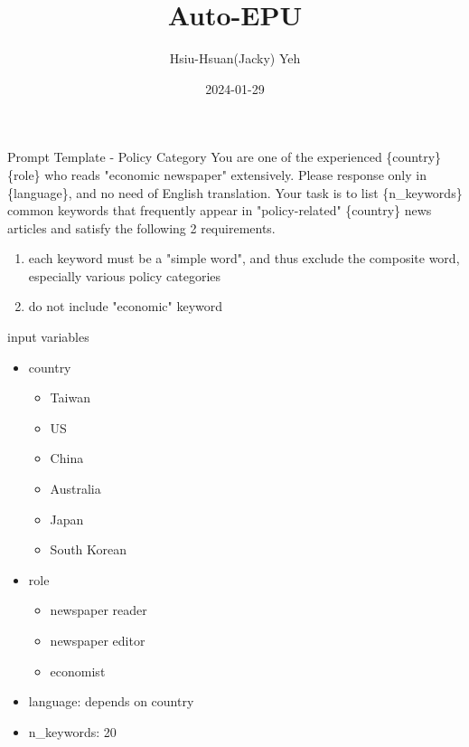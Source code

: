 \documentclass[12pt]{beamer}
\title{\huge{Auto-EPU}}
\author{Hsiu-Hsuan(Jacky) Yeh}
\date{2024-01-29}
\begin{document}
\maketitle


\begin{frame}{Prompt Template - Policy Category}
You are one of the experienced \{country\} \{role\} who reads
"economic newspaper" extensively. Please response only in \{language\}, and
no need of English translation.
\newline \newline
Your task is to list \{n\_keywords\} common keywords that
frequently appear in "policy-related"
\{country\} news articles and satisfy the following 2 requirements.
\newline
\begin{enumerate}
    \item each keyword must be a "simple word", and thus exclude the composite
        word, especially various policy categories
    \item do not include "economic" keyword
\end{enumerate}
\end{frame}


\begin{frame}{input variables}
\begin{itemize}
    \item country
    \begin{itemize}
        \item Taiwan
        \item US
        \item China
        \item Australia
        \item Japan
        \item South Korean
    \end{itemize}
    \item role
    \begin{itemize}
        \item newspaper reader
        \item newspaper editor
        \item economist
    \end{itemize}
    \item language: depends on country
    \item n\_keywords: 20
\end{itemize}
\end{frame}
\end{document}
